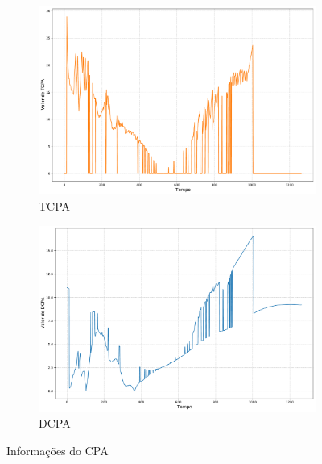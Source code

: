         \begin{figure}[H]
		\centering
		\begin{subfigure}{1\textwidth}
            \centering
            \includegraphics[width=\textwidth]{fig/chap5/overtake_tcpa.pdf}
            \caption{TCPA}
            \label{fig:chap5_overtake_tcpa}
        \end{subfigure}
        \begin{subfigure}{1\textwidth}
            \centering
            \includegraphics[width=\textwidth]{fig/chap5/overtake_dcpa.pdf}
            \caption{DCPA}
            \label{fig:chap5_overtake_dcpa}
        \end{subfigure}
        
        \caption{Informações do CPA}
        \label{fig:chap5_overtake_cpa}
        \end{figure}
        
